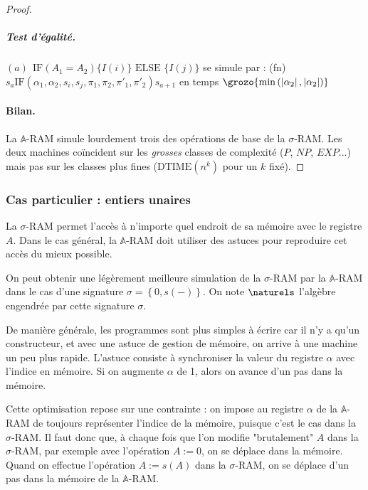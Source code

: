 \documentclass{report}
\newcommand{\sRAMifc}[2]{\text{IF} (A_1=A_2) \{I( #1 )\} \text{ ELSE } \{I( #2 )\}}
\newcommand{\bbA}{\mathbb{A}}
\begin{document}
\begin{proof}
						\subparagraph{Test d'égalité.}
						$(a) \:\: \sRAMifc{i}{j}$ se simule par : (fn) $s_a \text{IF}\left( \alpha_1, \alpha_2, s_i, s_j, \pi_1, \pi_2, \pi'_1, \pi'_2 \right) s_{a+1}$ en temps $\grozo{\min\left( \left| \alpha_2\right|, \left| \alpha_2 \right| \right)}$
						
						
					\paragraph{Bilan.}
					La $\bbA$-RAM simule lourdement trois des opérations de base de la $\sigma$-RAM. Les deux machines coïncident sur les \emph{grosses} classes de complexité ($P$, $NP$, $EXP$...) mais pas sur les classes plus fines ($\text{DTIME}(n^k)$ pour un $k$ fixé).
				\end{proof}
				
				
				
				
			\subsubsection{Cas particulier : entiers unaires}
			\label{subsubsec:sim_succ_RAM_N_RAM}
							
				La $\sigma$-RAM permet l'accès à n'importe quel endroit de sa mémoire avec le registre $A$. Dans le cas général, la $\bbA$-RAM doit utiliser des astuces pour reproduire cet accès du mieux possible. 
				
				
				On peut obtenir une légèrement meilleure simulation de la $\sigma$-RAM par la $\bbA$-RAM dans le cas d'une signature $\sigma = \left\lbrace 0, s(-)\right\rbrace$. On note $\naturels$ l'algèbre engendrée par cette signature $\sigma$.
				
				De manière générale, les programmes sont plus simples à écrire car il n'y a qu'un constructeur, et avec une astuce de gestion de mémoire, on arrive à une machine un peu plus rapide. L'astuce consiste à synchroniser la valeur du registre $\alpha$ avec l'indice en mémoire. Si on augmente $\alpha$ de 1, alors on avance d'un pas dans la mémoire. 
				
				Cette optimisation repose sur une contrainte : on impose au registre $\alpha$ de la $\bbA$-RAM de toujours représenter l'indice de la mémoire, puisque c'est le cas dans la $\sigma$-RAM. Il faut donc que, à chaque fois que l'on modifie "brutalement" $A$ dans la $\sigma$-RAM, par exemple avec l'opération $A :=0$, on se déplace dans la mémoire. Quand on effectue l'opération $A:=s(A)$ dans la $\sigma$-RAM, on se déplace d'un pas dans la mémoire de la $\bbA$-RAM. 
				
\end{document}
